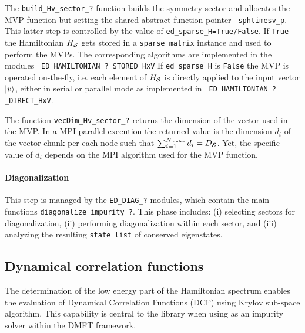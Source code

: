 \documentclass[edipack2.tex]{subfiles}
\begin{document}
The {\tt build\_Hv\_sector\_?} function builds the symmetry sector and
allocates the MVP function but setting the shared abstract function pointer {\tt
  sphtimesv\_p}. This latter step is controlled by the value of
{\tt ed\_sparse\_H=True/False}. If {\tt True} the Hamiltonian $H_{\cal S}$
gets stored in a {\tt sparse\_matrix} instance and used to perform
the MVPs. The corresponding algorithms are implemented in the modules {\tt
  ED\_HAMILTONIAN\_?\_STORED\_HxV}
If {\tt ed\_sparse\_H} is {\tt False} the MVP is operated on-the-fly,
i.e. each element of $H_{\cal S}$ is directly applied to the input
vector $|v\rangle$, either in serial or parallel mode as implemented in {\tt
  ED\_HAMILTONIAN\_?\_DIRECT\_HxV}.  

The function {\tt vecDim\_Hv\_sector\_?} returns the 
dimension of the vector used in the
MVP. In a MPI-parallel execution the returned value is the
dimension $d_i$ of the vector chunk per each node such that
$\sum_{i=1}^{N_\mathrm{nodes}}d_i = D_{\cal S}$. Yet, the specific value of $d_i$
depends on the MPI algorithm used for the MVP function.

\paragraph{\bf Diagonalization}
This step is managed by the {\tt ED\_DIAG\_?}
modules, which contain the main functions {\tt diagonalize\_impurity\_?}.
This phase includes: (i) selecting sectors for diagonalization, (ii)
performing diagonalization within each sector, and (iii) analyzing
the resulting {\tt state\_list} of conserved eigenstates.




\subsection{Dynamical correlation functions}\label{sSecGF}
The determination of the low energy part of the Hamiltonian spectrum
enables the evaluation of Dynamical Correlation Functions (DCF) using Krylov
sub-space algorithm.
This capability is central to the library when using \NAME as an
impurity solver within the DMFT framework.
\end{document}
